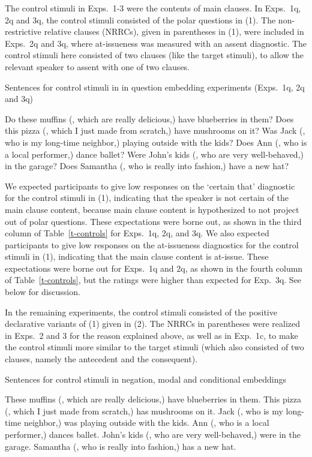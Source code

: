 \documentclass[11pt,fleqn]{article}
\newcommand{\6}{\mbox{$[\hspace*{-.6mm}[$}}
\newcommand{\9}{\mbox{$]\hspace*{-.6mm}]$}}
\begin{document}
  The control stimuli in Exps.~1-3 were the contents of main clauses. In Exps.~1q, 2q and 3q, the control stimuli consisted of the polar questions in (1). The non-restrictive relative clauses (NRRCs), given in parentheses in (1), were included in Exps.~2q and 3q, where at-issueness was measured with an assent diagnostic. The control stimuli here consisted of two clauses (like the target stimuli), to allow the relevant speaker to assent with one of two clauses.

  \begin{exe}
   Sentences for control stimuli in in question embedding experiments (Exps.~1q, 2q and 3q)
  \begin{xlist}
  \ex Do these muffins (, which are really delicious,) have blueberries in them?
  \ex Does this pizza (, which I just made from scratch,) have mushrooms on it? 
  \ex Was Jack (, who is my long-time neighbor,) playing outside with the kids? 
  \ex Does Ann (, who is a local performer,) dance ballet?
  \ex Were John's kids (, who are very well-behaved,) in the garage?
  \ex Does Samantha (, who is really into fashion,) have a new hat?
  \end{xlist}
  \end{exe}

  We expected participants to give low responses on the `certain that' diagnostic for the control stimuli in (1), indicating that the speaker is not certain of the main clause content, because main clause content is hypothesized to not project out of polar questions. These expectations were borne out, as shown in the third column of Table~\ref{t-controls} for Exps.~1q, 2q, and 3q. We also expected participants to give low responses on the at-issueness diagnostics for the control stimuli in (1), indicating that the main clause content is at-issue. These expectations were borne out for Exps.~1q and 2q, as shown in the fourth column of Table~\ref{t-controls}, but the ratings were higher than expected for Exp.~3q. See below for discussion.


  In the remaining experiments, the control stimuli consisted of the positive declarative variants of (1) given in (2). The NRRCs in parentheses were realized in Exps.~2 and 3 for the reason explained above, as well as in Exp.~1c, to make the control stimuli more similar to the target stimuli (which also consisted of two clauses, namely the antecedent and the consequent).

  \begin{exe}
    Sentences for control stimuli in negation, modal and conditional embeddings
  \begin{xlist}
  \ex These muffins (, which are really delicious,) have blueberries in them.
  \ex This pizza (, which I just made from scratch,) has mushrooms on it. 
  \ex Jack (, who is my long-time neighbor,) was playing outside with the kids. 
  \ex Ann (, who is a local performer,) dances ballet.
  \ex John's kids (, who are very well-behaved,) were in the garage.
  \ex Samantha (, who is really into fashion,) has a new hat.
  \end{xlist}
  \end{exe}
\end{document}
